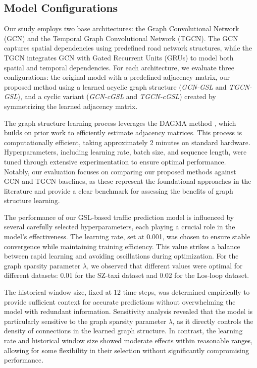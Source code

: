 \documentclass[pdflatex,sn-mathphys-num]{sn-jnl}%
\theoremstyle{thmstyleone}%
\theoremstyle{thmstyletwo}%
\theoremstyle{thmstylethree}%
\begin{document}
\subsection{Model Configurations}

Our study employs two base architectures: the Graph Convolutional Network (GCN) and the Temporal Graph Convolutional Network (TGCN). The GCN captures spatial dependencies using predefined road network structures, while the TGCN integrates GCN with Gated Recurrent Units (GRUs) to model both spatial and temporal dependencies. For each architecture, we evaluate three configurations: the original model with a predefined adjacency matrix, our proposed method using a learned acyclic graph structure (\textit{GCN-GSL} and \textit{TGCN-GSL}), and a cyclic variant (\textit{GCN-cGSL} and \textit{TGCN-cGSL}) created by symmetrizing the learned adjacency matrix.

The graph structure learning process leverages the DAGMA method \citep{Bello2024DAGMA}, which builds on prior work\citep{zheng2018dags} to efficiently estimate adjacency matrices. This process is computationally efficient, taking approximately 2 minutes on standard hardware. Hyperparameters, including learning rate, batch size, and sequence length, were tuned through extensive experimentation to ensure optimal performance. Notably, our evaluation focuses on comparing our proposed methods against GCN and TGCN baselines, as these represent the foundational approaches in the literature and provide a clear benchmark for assessing the benefits of graph structure learning.

The performance of our GSL-based traffic prediction model is influenced by several carefully selected hyperparameters, each playing a crucial role in the model's effectiveness. The learning rate, set at 0.001, was chosen to ensure stable convergence while maintaining training efficiency. This value strikes a balance between rapid learning and avoiding oscillations during optimization. For the graph sparsity parameter  $\lambda$, we observed that different values were optimal for different datasets: 0.01 for the SZ-taxi dataset and 0.02 for the Los-loop dataset. %

The historical window size, fixed at 12 time steps, was determined empirically to provide sufficient context for accurate predictions without overwhelming the model with redundant information. Sensitivity analysis revealed that the model is particularly sensitive to the graph sparsity parameter  $\lambda$, as it directly controls the density of connections in the learned graph structure. In contrast, the learning rate and historical window size showed moderate effects within reasonable ranges, allowing for some flexibility in their selection without significantly compromising performance.
\end{document}
